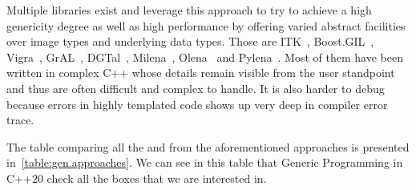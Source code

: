 Multiple libraries exist and leverage this approach to try to achieve a high genericity degree as well as high
performance by offering varied abstract facilities over image types and underlying data types. Those are
ITK~\parencite{johnson.2013.ITKSoftwareGuideThirdEdition,yoo.2002.engineering}, Boost.GIL~\parencite{bourdev.2006.bgil},
Vigra~\parencite{kothe.2011.generic}, GrAL~\parencite{berti.2006.gral}, DGTal~\parencite{coeurjolly.2016.dgtal},
Milena~\parencite{geraud.2012.ipolmeeting,levillain.2009.ismm,levillain.2010.icip},
Olena~\parencite{olena.2000.www,geraud.2000.europlop,levillain.2011.phd,geraud.2012.hdr,levillain.2014.ciarp} and
Pylena~\parencite{carlinet.2018.pylena}. Most of them have been written in complex C++ whose details remain visible from
the user standpoint and thus are often difficult and complex to handle. It is also harder to debug because errors in
highly templated code shows up very deep in compiler error trace.

The table comparing all the \pros and \cons from the aforementioned approaches is presented
in~\cref{table:gen.approaches}. We can see in this table that Generic Programming in C++20 check all the boxes that we
are interested in.

